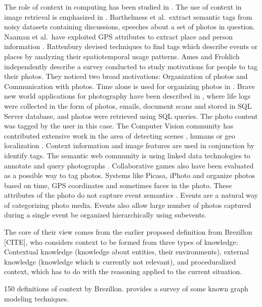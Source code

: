 The role of context in computing has been studied in \cite{chen2000survey}. The use of context in image retrieval is emphasized in \cite{jain2010content, datta2008image}. Barthelmess et al.\ extract semantic tags from noisy datasets containing discussions, speeches about a set of photos in question\cite{barthelmess2007toward}. Naaman et al.\ have exploited GPS attributes to extract place and person information \cite{naaman2005leveraging, naaman2005identity}. Rattenbury \cite{rattenbury2009methods} devised techniques to find tags which describe events or places by analyzing their spatiotemporal usage patterns. Ames and Frohlich \cite{ames2007we, frohlich2002requirements} independently describe a survey conducted to study motivations for people to tag their photos. They noticed two broad motivations: Organization of photos and Communication with photos. Time alone is used for organizing photos in \cite{graham2002time, hailpern2011youpivot}. Brave new world applications for photography have been described in \cite{gemmell2002mylifebits, dumais2003stuff}, where life logs were collected in the form of photos, emails, document scans and stored in SQL Server database, and photos were retrieved using SQL queries. The photo content was tagged by the user in this case. The Computer Vision community has contributed extensive work in the area of detecting scenes \cite{xiao2010sun}, humans \cite{dalal2005histograms} or geo localization \cite{hays2008im2gps}. Context information and image features are used in conjunction by \cite{o2009context, cao2008annotating, boutell2005beyond, cao2008eventscene} identify tags. The semantic web community is using linked data technologies to annotate and query photographs \cite{monaghan2006automating, nowack2006confoto}. Collaborative games also have been evaluated as a possible way to tag photos\cite{diakopoulos2007photoplay}. Systems like Picasa, iPhoto and \cite{graham2002time} organize photos based on time, GPS coordinates and sometimes faces in the photo. These attributes of the photo do not capture event semantics \cite{sawant2011automatic}. Events are a natural way of categorizing photo media. Events also allow large number of photos captured during a single event be organized hierarchically using subevents.

The core of their view comes from the earlier proposed definition from Brezillon [CITE], who considers context to be formed from three types of knowledge: Contextual knowledge (knowledge about entities, their environments), external knowledge (knowledge which is currently not relevant), and proceduralized context, which has to do with the reasoning applied to the current situation.

150 definitions of context by Brezillon.
 \cite{mostefaoui2004context} provides a survey of some known graph modeling techniques.